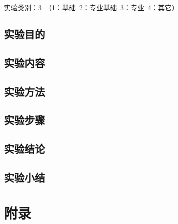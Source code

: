 ﻿\documentclass[UTF8,12pt]{article}
\begin{document}
实验类别：3\ （1：基础\ 2：专业基础\ 3：专业\ 4：其它）

\subsection{实验目的}

\subsection{实验内容}

\subsection{实验方法}

\subsection{实验步骤}

\subsection{实验结论}

\subsection{实验小结}

\newpage

\section{附录}
\end{document}

